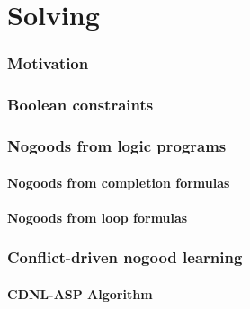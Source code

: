 \part{Solving}
\section{Motivation}


\section{Boolean constraints}

\section{Nogoods from logic programs}
\subsection{Nogoods from completion formulas}
% 
\subsection{Nogoods from loop formulas}
% 
\section{Conflict-driven nogood learning}

% 
% 
% 
\subsection{CDNL-ASP Algorithm}
% 
